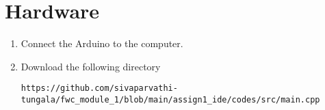 \documentclass[10pt, a4paper]{article}
\begin{document}
	\section{Hardware}
	\begin{enumerate}[1.]
\item Connect the Arduino to the computer.
\item Download the following directory
\begin{lstlisting}
https://github.com/sivaparvathi-tungala/fwc_module_1/blob/main/assign1_ide/codes/src/main.cpp
\end{lstlisting}
\end{enumerate}


\end{document}
